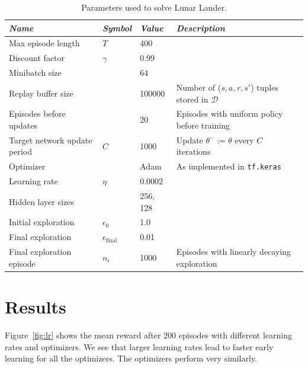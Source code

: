 \documentclass{article}
\begin{document}
\begin{table}[t]
  \centering
  \caption{Parameters used to solve Lunar Lander.}
  \label{tbl:params}
\begin{tabular}{*4l} \toprule
\emph{Name}       & \emph{Symbol} & \emph{Value} & \emph{Description} \\ \midrule
Max episode length                 & $T$ & 400 & \\
Discount factor & $\gamma$ & 0.99   & \\
Minibatch size &  & 64 & \\
Replay buffer size & & 100000 & Number of ($s,a,r,s'$) tuples stored in $\mathcal{D}$ \\
Episodes before updates & & 20 & Episodes with uniform policy before training \\
Target network update period & $C$ & 1000 & Update $\theta^{-} := \theta$ every $C$ iterations \\
Optimizer & & Adam & As implemented in \texttt{tf.keras} \\
Learning rate & $\eta$ & 0.0002 & \\
Hidden layer sizes & & 256, 128 & \\
Initial exploration & $\epsilon_0$ & 1.0 & \\
Final exploration & $\epsilon_{\text{final}}$ & 0.01 & \\
Final exploration episode & $n_\epsilon$ & 1000 & Episodes with linearly decaying exploration \\ \bottomrule
\end{tabular}
\end{table}

\section{Results}
\label{results}
Figure~\ref{fig:lr} shows the mean reward after 200 episodes with different learning rates and optimizers. We see that larger learning rates lead to faster early learning for all the optimizers. The optimizers perform very similarly.
\end{document}
